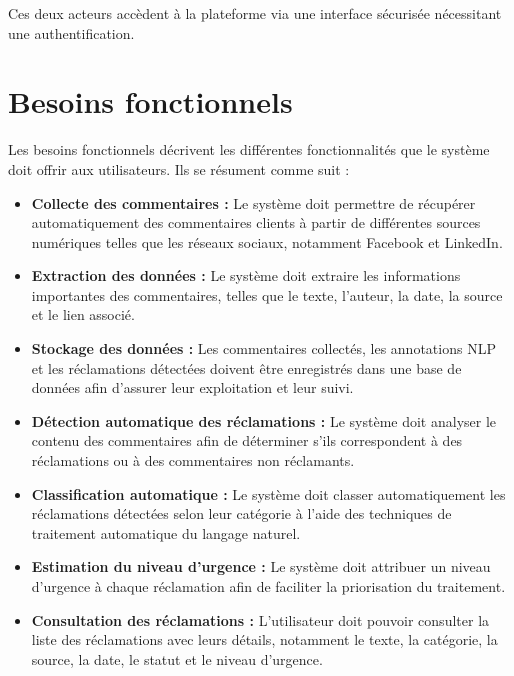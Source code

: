 \documentclass[12pt,a4paper,oneside]{report}
\begin{document}
Ces deux acteurs accèdent à la plateforme via une interface sécurisée nécessitant une authentification.

\section{Besoins fonctionnels}

Les besoins fonctionnels décrivent les différentes fonctionnalités que le système doit offrir aux utilisateurs. Ils se résument comme suit :

\begin{itemize}

\item \textbf{Collecte des commentaires :}  
Le système doit permettre de récupérer automatiquement des commentaires clients à partir de différentes sources numériques telles que les réseaux sociaux, notamment Facebook et LinkedIn.

\item \textbf{Extraction des données :}  
Le système doit extraire les informations importantes des commentaires, telles que le texte, l’auteur, la date, la source et le lien associé.

\item \textbf{Stockage des données :}  
Les commentaires collectés, les annotations NLP et les réclamations détectées doivent être enregistrés dans une base de données afin d’assurer leur exploitation et leur suivi.

\item \textbf{Détection automatique des réclamations :}  
Le système doit analyser le contenu des commentaires afin de déterminer s’ils correspondent à des réclamations ou à des commentaires non réclamants.

\item \textbf{Classification automatique :}  
Le système doit classer automatiquement les réclamations détectées selon leur catégorie à l’aide des techniques de traitement automatique du langage naturel.

\item \textbf{Estimation du niveau d’urgence :}  
Le système doit attribuer un niveau d’urgence à chaque réclamation afin de faciliter la priorisation du traitement.

\item \textbf{Consultation des réclamations :}  
L’utilisateur doit pouvoir consulter la liste des réclamations avec leurs détails, notamment le texte, la catégorie, la source, la date, le statut et le niveau d’urgence.


\end{itemize}
\end{document}
